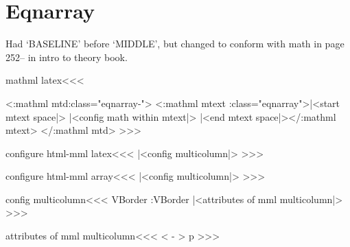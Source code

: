 {{{{{{%
\section{Eqnarray}

Had `BASELINE' before `MIDDLE', but changed to conform with math
in page 252-- in intro to theory book.

\<mathml latex\><<<
   {\ifvmode \IgnorePar \fi \EndP}
   {\ifvmode \IgnorePar \fi \EndP \ShowPar \par}
   {}{}
   {}%
   {}
   {}  {}
   {\Tg<\a:mathml mtd\Hnewline \mml:class="eqnarray-\HCol">
      \ifnum {}
        \Tg<\a:mathml mtext 
             \mml:class="eqnarray">|<start mtext space|>\PauseMathClass 
        \mtexttrue
        |<config math within mtext|>%
      \fi}
   {\ifnum {} \mtextfalse 
      \EndPauseMathClass|<end mtext space|>\Tg</\a:mathml mtext>\fi
      \Tg</\a:mathml mtd>}
>>>




\<configure html-mml latex\><<<
|<config multicolumn|>
>>>


\<configure html-mml array\><<<
|<config multicolumn|>
>>>


\<config multicolumn\><<<
   {\let\sv:VBorder\VBorder
    \let\VBorder\empty
   }
   {\let\VBorder\sv:VBorder}   
   {\ifmmode {}%
       {|<attributes of mml multicolumn|>\HColAlign}\else
       \ifvmode\IgnorePar\fi
       \HColAlign\HCode{>}\fi }
   {\ifmmode  {}\else
    \ifvmode\IgnorePar\fi \EndP{}\fi }
\def\gob:sp#1{#1}
>>>

\<attributes of mml multicolumn\><<<
 {}{}
   {<}{}
   {-}{}
   {>}{}
   {p}{}
   {}%
>>>


}}}}}}
